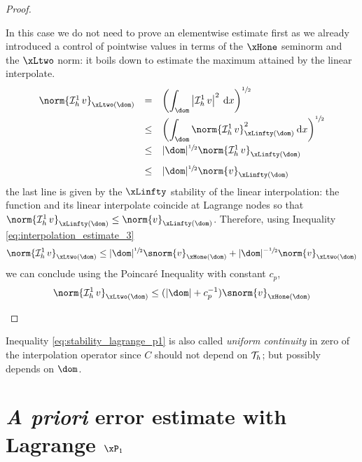 \begin{proof}
\begin{tmaproofitems}
In this case we do not need to prove an elementwise estimate first as we already introduced a control of pointwise values in terms of the $\xHone$ seminorm and the $\xLtwo$ norm: it boils down to estimate the maximum attained by the linear interpolate.
\begin{equation*}
\begin{array}{lcl}
\norm{\Lgrh{1}v}_{\xLtwo(\dom)} &=&\displaystyle \left(\int_\dom \Abs{\Lgrh{1}v}^2 \md x\right)^{\sfrac{1}{2}}\\[2ex]
                              &\leq&\displaystyle \left(\int_\dom \norm{\Lgrh{1}v}_{\xLinfty(\dom)}^2 \md x\right)^{\sfrac{1}{2}}\\[2ex]
                              &\leq& |\dom|^{\sfrac{1}{2}} \norm{\Lgrh{1}v}_{\xLinfty(\dom)}\\[2ex]
                              &\leq& |\dom|^{\sfrac{1}{2}} \norm{v}_{\xLinfty(\dom)}\\
\end{array}
\end{equation*}
the last line is given by the $\xLinfty$ stability of the linear interpolation: the function and its linear interpolate coincide at Lagrange nodes so that $\norm{\Lgrh{1}v}_{\xLinfty(\dom)} \leq \norm{v}_{\xLinfty(\dom)}$.
Therefore, using Inequality \eqref{eq:interpolation_estimate_3}
\begin{equation*}
\norm{\Lgrh{1}v}_{\xLtwo(\dom)}  \leq |\dom|^{\sfrac{1}{2}}\snorm{v}_{\xHone(\dom)} + |\dom|^{-\sfrac{1}{2}}\norm{v}_{\xLtwo(\dom)}
\end{equation*}
we can conclude using the Poincaré Inequality with constant $c_p$,
\begin{equation*}
\norm{\Lgrh{1}v}_{\xLtwo(\dom)}  \leq (|\dom| + c_p^{-1})\snorm{v}_{\xHone(\dom)}
\end{equation*}
\end{tmaproofitems}
\end{proof}

Inequality \eqref{eq:stability_lagrange_p1} is also called \textit{uniform continuity} in zero of the interpolation operator since $C$ should not depend on ${\mathcal T}_h$; but possibly depends on $\dom$.

\section{\textit{A priori} error estimate with Lagrange $\xPone$}


